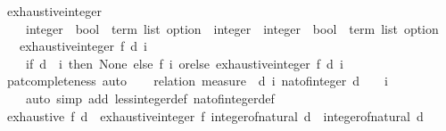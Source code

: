 \begin{isabellebody}
\ exhaustive{\isacharunderscore}{\kern0pt}integer{\isacharprime}{\kern0pt}\ {\isacharcolon}{\kern0pt}{\isacharcolon}{\kern0pt}\isanewline
\ \ \ \ {\isachardoublequoteopen}{\isacharparenleft}{\kern0pt}integer\ {\isasymRightarrow}\ {\isacharparenleft}{\kern0pt}bool\ {\isasymtimes}\ term\ list{\isacharparenright}{\kern0pt}\ option{\isacharparenright}{\kern0pt}\ {\isasymRightarrow}\ integer\ {\isasymRightarrow}\ integer\ {\isasymRightarrow}\ {\isacharparenleft}{\kern0pt}bool\ {\isasymtimes}\ term\ list{\isacharparenright}{\kern0pt}\ option{\isachardoublequoteclose}\isanewline
\ \ \ {\isachardoublequoteopen}exhaustive{\isacharunderscore}{\kern0pt}integer{\isacharprime}{\kern0pt}\ f\ d\ i\ {\isacharequal}{\kern0pt}\isanewline
\ \ \ \ {\isacharparenleft}{\kern0pt}if\ d\ {\isacharless}{\kern0pt}\ i\ then\ None\ else\ {\isacharparenleft}{\kern0pt}f\ i\ orelse\ exhaustive{\isacharunderscore}{\kern0pt}integer{\isacharprime}{\kern0pt}\ f\ d\ {\isacharparenleft}{\kern0pt}i\ {\isacharplus}{\kern0pt}\ {}{\isacharparenright}{\kern0pt}{\isacharparenright}{\kern0pt}{\isacharparenright}{\kern0pt}{\isachardoublequoteclose}\isanewline
%
\isadelimproof
%
\endisadelimproof
%
\isatagproof
{}\isamarkupfalse%
\ pat{\isacharunderscore}{\kern0pt}completeness\ auto%
\endisatagproof
{\isafoldproof}%
%
\isadelimproof
\isanewline
%
\endisadelimproof
\isanewline
{}\isamarkupfalse%
\isanewline
%
\isadelimproof
\ \ %
\endisadelimproof
%
\isatagproof
{}\isamarkupfalse%
\ {\isacharparenleft}{\kern0pt}relation\ {\isachardoublequoteopen}measure\ {\isacharparenleft}{\kern0pt}{\isasymlambda}{\isacharparenleft}{\kern0pt}{\isacharunderscore}{\kern0pt}{\isacharcomma}{\kern0pt}\ d{\isacharcomma}{\kern0pt}\ i{\isacharparenright}{\kern0pt}{\isachardot}{\kern0pt}\ nat{\isacharunderscore}{\kern0pt}of{\isacharunderscore}{\kern0pt}integer\ {\isacharparenleft}{\kern0pt}d\ {\isacharplus}{\kern0pt}\ {}\ {\isacharminus}{\kern0pt}\ i{\isacharparenright}{\kern0pt}{\isacharparenright}{\kern0pt}{\isachardoublequoteclose}{\isacharparenright}{\kern0pt}\isanewline
\ \ \ \ {\isacharparenleft}{\kern0pt}auto\ simp\ add{\isacharcolon}{\kern0pt}\ less{\isacharunderscore}{\kern0pt}integer{\isacharunderscore}{\kern0pt}def\ nat{\isacharunderscore}{\kern0pt}of{\isacharunderscore}{\kern0pt}integer{\isacharunderscore}{\kern0pt}def{\isacharparenright}{\kern0pt}%
\endisatagproof
{\isafoldproof}%
%
\isadelimproof
\isanewline
%
\endisadelimproof
\isanewline
{}\isamarkupfalse%
\ {\isachardoublequoteopen}exhaustive\ f\ d\ {\isacharequal}{\kern0pt}\ exhaustive{\isacharunderscore}{\kern0pt}integer{\isacharprime}{\kern0pt}\ f\ {\isacharparenleft}{\kern0pt}integer{\isacharunderscore}{\kern0pt}of{\isacharunderscore}{\kern0pt}natural\ d{\isacharparenright}{\kern0pt}\ {\isacharparenleft}{\kern0pt}{\isacharminus}{\kern0pt}\ {\isacharparenleft}{\kern0pt}integer{\isacharunderscore}{\kern0pt}of{\isacharunderscore}{\kern0pt}natural\ d{\isacharparenright}{\kern0pt}{\isacharparenright}{\kern0pt}{\isachardoublequoteclose}\isanewline

\end{isabellebody}
